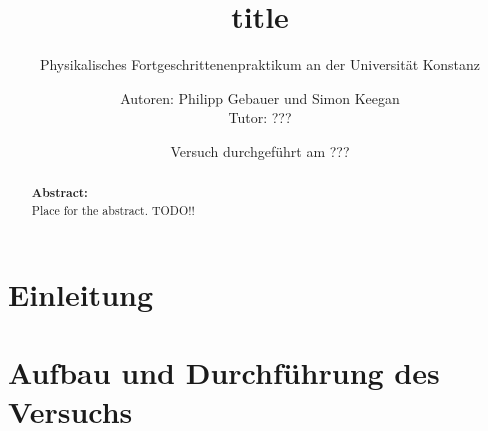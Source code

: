 

 
 \title{title}
 \subtitle{Physikalisches Fortgeschrittenenpraktikum an der Universität Konstanz}
 \author{Autoren: Philipp Gebauer und Simon Keegan \\ \large{Tutor: ???}}
 \date{Versuch durchgeführt am ???}
 \maketitle
 \vspace{2.5 cm}
 \begin{abstract}
     \noindent \textbf{Abstract:}\\
     Place for the abstract. TODO!!
     \vspace{1cm}
     
 \end{abstract}
 \thispagestyle{empty}
 \newpage
 
 \tableofcontents
 \thispagestyle{empty}
 \newpage
 \setcounter{page}{1}    
 
\section{Einleitung}
\section{Aufbau und Durchführung des Versuchs}
 
     
     \newpage
     
 
 \listoffigures
 
 
 